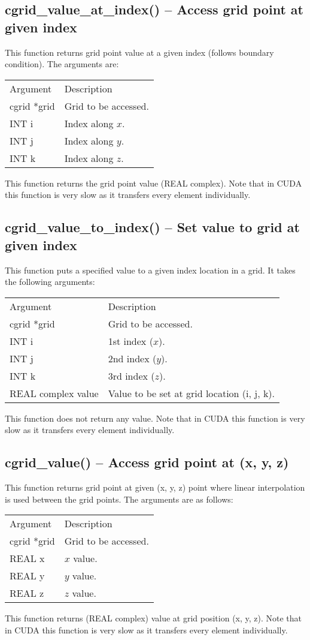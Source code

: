 \documentclass[12pt,letterpaper]{report}
\begin{document}
\subsection{cgrid\_value\_at\_index() -- Access grid point at given index}

This function returns grid point value at a given index (follows boundary condition). The arguments are:
\begin{longtable}{p{} p{}}
Argument & Description\\
\cline{1-2}
cgrid *grid & Grid to be accessed.\\
INT i & Index along $x$.\\
INT j & Index along $y$.\\
INT k & Index along $z$.\\
\end{longtable}
\noindent
This function returns the grid point value (REAL complex). Note that in CUDA this function is very slow as it transfers every element individually.

\subsection{cgrid\_value\_to\_index() -- Set value to grid at given index}

This function puts a specified value to a given index location in a grid. It takes the following arguments:
\begin{longtable}{p{} p{}}
Argument & Description\\
\cline{1-2}
cgrid *grid & Grid to be accessed.\\
INT i & 1st index ($x$).\\
INT j & 2nd index ($y$).\\
INT k & 3rd index ($z$).\\
REAL complex value & Value to be set at grid location (i, j, k).\\
\end{longtable}
\noindent
This function does not return any value. Note that in CUDA this function is very slow as it transfers every element individually.

\subsection{cgrid\_value() -- Access grid point at (x, y, z)}

This function returns grid point at given (x, y, z) point where linear interpolation is used between the grid points. The arguments are as follows:
\begin{longtable}{p{} p{}}
Argument & Description\\
\cline{1-2}
cgrid *grid & Grid to be accessed.\\
REAL x & $x$ value.\\
REAL y & $y$ value.\\
REAL z & $z$ value.\\
\end{longtable}
\noindent
This function returns (REAL complex) value at grid position (x, y, z). Note that in CUDA this function is very slow as it transfers every element individually.
\end{document}
